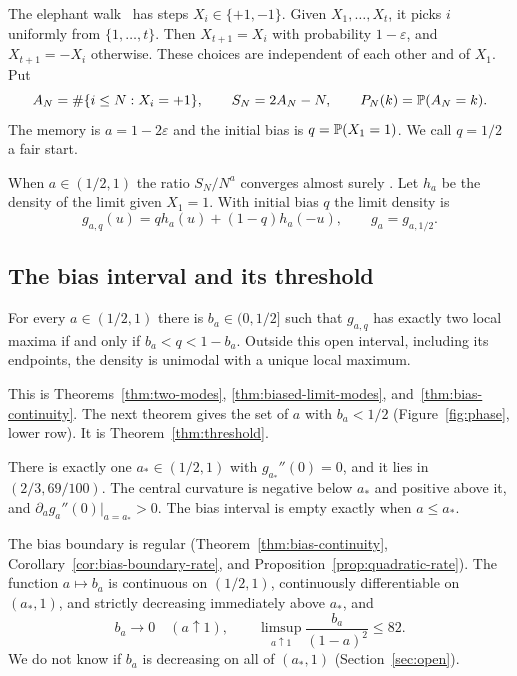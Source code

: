 The elephant walk~\cite{schutz2004} has steps $X_i\in\{+1,-1\}$.
Given $X_1,\dots,X_t$, it picks $i$ uniformly from $\{1,\dots,t\}$.
Then $X_{t+1}=X_i$ with probability $1-\varepsilon$, and
$X_{t+1}=-X_i$ otherwise. These choices are independent of each other
and of $X_1$. Put
\[
 A_N=\#\{i\le N:X_i=+1\},\qquad S_N=2A_N-N,\qquad
 P_N(k)=\mathbb{P}(A_N=k).
\]
The memory is $a=1-2\varepsilon$ and the initial bias is
$q=\mathbb{P}(X_1=1)$. We call $q=1/2$ a fair start.

When $a\in(1/2,1)$ the ratio $S_N/N^a$ converges almost surely
\cite{baurbert2016,bercu2018}. Let $h_a$ be the density of the limit
given $X_1=1$. With initial bias $q$ the limit density is
\[
 g_{a,q}(u)=q h_a(u)+(1-q)h_a(-u),\qquad g_a=g_{a,1/2}.
\]

\subsection{The bias interval and its threshold}\label{sec:results}

\begin{theorem}\label{thm:main-limit}
For every $a\in(1/2,1)$ there is $b_a\in(0,1/2]$ such that
$g_{a,q}$ has exactly two local maxima if and only if
$b_a<q<1-b_a$. Outside this open interval, including its endpoints,
the density is unimodal with a unique local maximum.
\end{theorem}

This is Theorems~\ref{thm:two-modes}, \ref{thm:biased-limit-modes},
and~\ref{thm:bias-continuity}. The next theorem gives the set of $a$
with $b_a<1/2$ (Figure~\ref{fig:phase}, lower row). It is
Theorem~\ref{thm:threshold}.

\begin{theorem}\label{thm:main-analytic}
There is exactly one $a_*\in(1/2,1)$ with $g_{a_*}''(0)=0$, and it
lies in $(2/3,69/100)$. The central curvature is negative below $a_*$
and positive above it, and $\partial_a g_a''(0)|_{a=a_*}>0$.
The bias interval is empty exactly when $a\le a_*$.
\end{theorem}

The bias boundary is regular (Theorem~\ref{thm:bias-continuity},
Corollary~\ref{cor:bias-boundary-rate}, and
Proposition~\ref{prop:quadratic-rate}). The function $a\mapsto b_a$ is
continuous on $(1/2,1)$, continuously differentiable on $(a_*,1)$, and
strictly decreasing immediately above $a_*$, and
\[
 b_a\to0\quad(a\uparrow1),\qquad
 \limsup_{a\uparrow1}\frac{b_a}{(1-a)^2}\le82 .
\]
We do not know if $b_a$ is decreasing on all of $(a_*,1)$
(Section~\ref{sec:open}).

